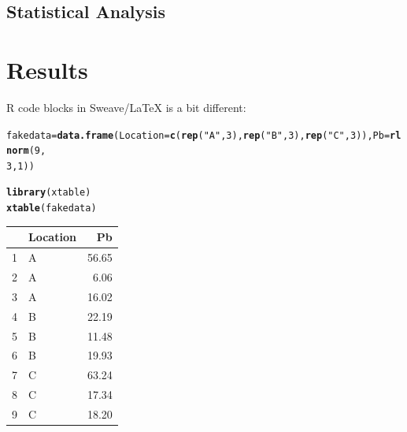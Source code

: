 \documentclass{article}\usepackage[]{graphicx}\usepackage[]{color}
\makeatletter
\newcommand{\hlnum}[1]{\textcolor[rgb]{0.686,0.059,0.569}{#1}}%
\newcommand{\hlstr}[1]{\textcolor[rgb]{0.192,0.494,0.8}{#1}}%
\newcommand{\hlstd}[1]{\textcolor[rgb]{0.345,0.345,0.345}{#1}}%
\newcommand{\hlkwb}[1]{\textcolor[rgb]{0.69,0.353,0.396}{#1}}%
\newcommand{\hlkwc}[1]{\textcolor[rgb]{0.333,0.667,0.333}{#1}}%
\newcommand{\hlkwd}[1]{\textcolor[rgb]{0.737,0.353,0.396}{\textbf{#1}}}%
\newenvironment{kframe}{%
 \def\at@end@of@kframe{}%
 \ifinner\ifhmode%
  \def\at@end@of@kframe{\end{minipage}}%
  \begin{minipage}{\columnwidth}%
 \fi\fi%
 \def\FrameCommand##1{\hskip\@totalleftmargin \hskip-\fboxsep
 \colorbox{shadecolor}{##1}\hskip-\fboxsep
     \hskip-\linewidth \hskip-\@totalleftmargin \hskip\columnwidth}%
 \MakeFramed {\advance\hsize-\width
   \@totalleftmargin\z@ \linewidth\hsize
   \@setminipage}}%
 {\par\unskip\endMakeFramed%
 \at@end@of@kframe}
\newenvironment{knitrout}{}{} %
\makeatother
\begin{document}
\subsection{Statistical Analysis}





\section{Results}

R code blocks in Sweave/LaTeX is a bit different:

\begin{knitrout}
\color{fgcolor}\begin{kframe}
\begin{alltt}
\hlstd{fakedata} \hlkwb{=} \hlkwd{data.frame}\hlstd{(}\hlkwc{Location} \hlstd{=} \hlkwd{c}\hlstd{(}\hlkwd{rep}\hlstd{(}\hlstr{"A"}\hlstd{,} \hlnum{3}\hlstd{),} \hlkwd{rep}\hlstd{(}\hlstr{"B"}\hlstd{,} \hlnum{3}\hlstd{),} \hlkwd{rep}\hlstd{(}\hlstr{"C"}\hlstd{,} \hlnum{3}\hlstd{)),} \hlkwc{Pb} \hlstd{=} \hlkwd{rlnorm}\hlstd{(}\hlnum{9}\hlstd{,}
    \hlnum{3}\hlstd{,} \hlnum{1}\hlstd{))}
\end{alltt}
\end{kframe}
\end{knitrout}

\begin{kframe}
\begin{alltt}
\hlkwd{library}\hlstd{(xtable)}
\hlkwd{xtable}\hlstd{(fakedata)}
\end{alltt}
\end{kframe}%
\begin{table}[ht]
\centering
\begin{tabular}{rlr}
  \hline
 & Location & Pb \\ 
  \hline
1 & A & 56.65 \\ 
  2 & A & 6.06 \\ 
  3 & A & 16.02 \\ 
  4 & B & 22.19 \\ 
  5 & B & 11.48 \\ 
  6 & B & 19.93 \\ 
  7 & C & 63.24 \\ 
  8 & C & 17.34 \\ 
  9 & C & 18.20 \\ 
   \hline
\end{tabular}
\end{table}
\end{document}
